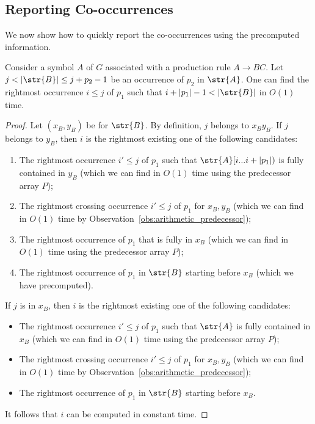 \subsection{Reporting Co-occurrences}
We now show how to quickly report the co-occurrences using the precomputed information. 

\begin{proposition}\label{claim:predecessor_of_crossing}
Consider a symbol $A$ of $G$ associated with a production rule $A \rightarrow BC$. Let $j < |\str{B}| \le j+p_2-1$ be an occurrence of $p_2$ in $\str{A}$. One can find the rightmost occurrence $i \le j$ of $p_1$ such that $i+|p_1|-1 < |\str{B}|$ in $O(1)$ time.  
\end{proposition}
\begin{proof}
Let $(x_B, y_B)$ be  for $\str{B}$. By definition, $j$ belongs to $x_By_B$. If $j$ belongs to $y_B$, then $i$ is the rightmost existing one of the following candidates:
\begin{enumerate}
    \item The rightmost occurrence $i' \le j$ of $p_1$ such that $\str{A}[i...i+|p_1|)$ is fully contained in $y_B$ (which we can find in $O(1)$ time using the predecessor array $P$); 
    \item The rightmost crossing occurrence $i' \le j$ of $p_1$ for $x_B, y_B$ (which we can find in $O(1)$ time by Observation~\ref{obs:arithmetic_predecessor});
    \item The rightmost occurrence of $p_1$ that is fully in $x_B$ (which we can find in $O(1)$ time using the predecessor array $P$); 
    \item The rightmost occurrence of $p_1$ in $\str{B}$ starting before $x_B$ (which we have precomputed). 
\end{enumerate}
If $j$ is in $x_B$, then $i$ is the rightmost existing one of the following candidates:
     \begin{itemize}
         \item The rightmost occurrence $i' \le j$ of $p_1$ such that $\str{A}$ is fully contained in $x_B$ (which we can find in $O(1)$ time using the predecessor array $P$);
         \item The rightmost crossing occurrence $i' \le j$ of $p_1$ for $x_B, y_B$ (which we can find in $O(1)$ time by Observation~\ref{obs:arithmetic_predecessor});
         \item The rightmost occurrence of $p_1$ in $\str{B}$ starting before $x_B$. 
     \end{itemize}
It follows that $i$ can be computed in constant time.
 
\end{proof}

